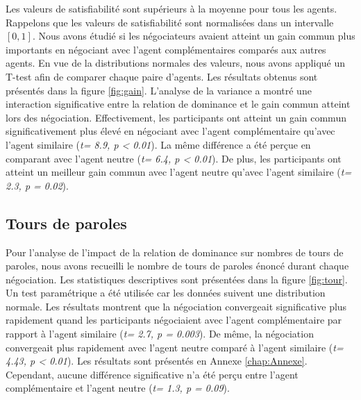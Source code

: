 	Les valeurs de satisfiabilité sont supérieurs à la moyenne pour tous les agents. Rappelons que les valeurs de satisfiabilité sont normalisées dans un intervalle $[0, 1]$. Nous avons étudié si les négociateurs avaient atteint un gain commun plus importants en négociant avec l'agent complémentaires comparés aux autres agents. En vue de la distributions normales des valeurs, nous avons appliqué un T-test afin de comparer chaque paire d'agents. Les résultats obtenus sont présentés dans la figure \ref{fig:gain}. L'analyse de la variance a montré une interaction significative entre la relation de dominance et le gain commun atteint lors des négociation. Effectivement, les participants ont atteint un gain commun significativement plus élevé en négociant avec l'agent complémentaire qu'avec l'agent similaire (\emph{t= 8.9, p < 0.01}). La même différence a été perçue en comparant avec l'agent neutre (\emph{t= 6.4, p < 0.01}).
	De plus, les participants ont atteint un meilleur gain commun avec l'agent neutre qu'avec l'agent similaire (\emph{t= 2.3, p = 0.02}).
	

	
	\subsection{Tours de paroles}
	
	Pour l'analyse de l'impact de la relation de dominance sur nombres de tours de paroles, nous avons recueilli le nombre de tours de paroles énoncé durant chaque négociation. Les statistiques descriptives sont présentées dans la figure \ref{fig:tour}. Un test paramétrique a été utilisée car les données suivent une distribution normale. Les résultats montrent que la négociation convergeait significative plus rapidement quand les participants négociaient avec l'agent complémentaire par rapport à l'agent similaire (\emph{t= 2.7, p = 0.003}). De même, la négociation convergeait plus rapidement avec l'agent neutre comparé à l'agent similaire (\emph{t= 4.43, p < 0.01}).  Les résultats sont présentés en Annexe \ref{chap:Annexe}.
	Cependant, aucune différence significative n'a été perçu entre l'agent complémentaire et l'agent neutre (\emph{t= 1.3, p = 0.09}).  
	
